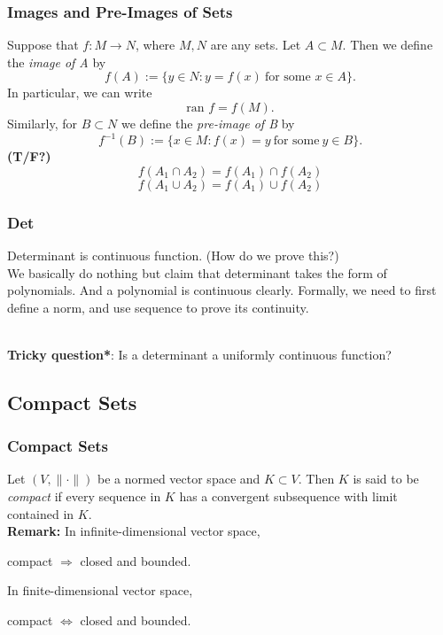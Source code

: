 \documentclass[12pt, t]{beamer}
\renewcommand{\emph}[1]{{\color{Turquoise3}\textsl{#1}}}
\newcommand{\nullspace}{~\\[15pt]}
\begin{document}
\begin{frame}
    \frametitle{Images and Pre-Images of Sets}
    Suppose that $f:M\to N$, where $M,N$ are any sets. Let $A\subset M$. Then we define the \emph{image of A} by
    \[f(A):=\{y\in N:y=f(x)~\text{for some }x\in A\}.\]
    In particular, we can write
    \[\text{ran }f=f(M).\]
    Similarly, for $B\subset N$ we define the \emph{pre-image of B} by
    \begin{equation}\label{2.1.11}
        f^{-1}(B):=\{x\in M:f(x)=y~\text{for some}~y\in B\}.
    \end{equation}
    \textbf{(T/F?)} $$f\left(A_{1} \cap A_{2}\right)=f\left(A_{1}\right) \cap f\left(A_{2}\right)$$
    $$f\left(A_{1} \cup A_{2}\right)=f\left(A_{1}\right) \cup f\left(A_{2}\right)$$
\end{frame}

\begin{frame}
    \frametitle{Det}
    Determinant is continuous function. (How do we prove this?)
    \pause
    \nullspace
    We basically do nothing but claim that determinant takes the form of polynomials. And a polynomial is continuous clearly. Formally, we need to first define a norm, and use sequence to prove its continuity.

    \nullspace \textbf{Tricky question*}: Is a determinant a uniformly continuous function?

\end{frame}

\subsection{Compact Sets}
\begin{frame}
    \frametitle{Compact Sets}
    Let $(V,\|\cdot\|)$ be a normed vector space and $K\subset V$. Then $K$ is said to be \emph{compact} if every sequence in $K$ has a convergent subsequence with limit contained in $K$.
    \nullspace
    \textbf{Remark:}
    In infinite-dimensional vector space,
    \begin{center}
        compact $\Rightarrow$ closed and bounded.

    \end{center}
    In finite-dimensional vector space,
    \begin{center}
        compact $\Leftrightarrow$ closed and bounded.
    \end{center}
\end{frame}
\end{document}
